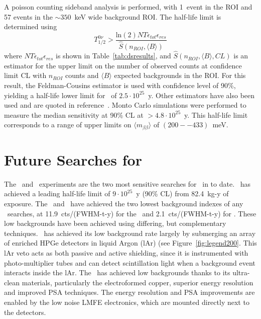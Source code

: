 \documentclass[/main.tex]{subfiles}
\begin{document}
A poisson counting sideband analysis is performed, with 1~event in the ROI and 57 events in the ${\sim}350$~keV wide background ROI.
The half-life limit is determined using
\begin{equation}
  T_{1/2}^{0\nu}>\frac{\mathrm{ln}(2)NT\epsilon_{tot}\epsilon_{res}}{\hat{S}(n_{ROI}, \langle B\rangle)}
\end{equation}
where $NT\epsilon_{tot}\epsilon_{res}$ is shown in Table~\ref{tab:dsresults}, and $\hat{S}(n_{ROI}, \langle B\rangle, CL)$ is an estimator for the upper limit on the number of observed counts at confidence limit CL with $n_{ROI}$ counts and $\langle B\rangle$ expected backgrounds in the ROI.
For this result, the Feldman-Cousins estimator\cite{feldmancousins} is used with confidence level of 90\%, yielding a half-life lower limit for  \znbb\ of $2.5\cdot10^{25}$~y.
Other estimators have also been used and are quoted in reference~\cite{mjd2019}.
Monto Carlo simulations were performed to measure the median sensitivity at 90\% CL at $>4.8\cdot10^{25}$~y.
This half-life limit corresponds to a range of upper limits on $\langle m_{\beta\beta}\rangle$ of $(200--433)$~meV.

\section{Future Searches for  \znbb} \label{sec:legend}
The \MJD\ and \Gerda\ experiments are the two most sensitive searches for \znbb\ in  to date.
\Gerda\ has achieved a leading half-life limit of $9\cdot10^{25}$~y (90\% CL) from 82.4~kg-y of exposure\cite{gerda}.
The \MJD\ and \Gerda\ have achieved the two lowest background indexes of any \znbb\ searches, at 11.9~cts/(FWHM-t-y) for the \MJD\ and 2.1~cts/(FWHM-t-y) for \Gerda.
These low backgrounds have been achieved using differing, but complementary techniques.
\Gerda\ has achieved its low background rate largely by submerging an array of enriched HPGe detectors in liquid Argon (lAr) (see Figure~\ref{fig:legend200}.
This lAr veto acts as both passive and active shielding, since it is instrumented with photo-multiplier tubes and can detect scintillation light when a background event interacts inside the lAr.
The \MJD\ has achieved low backgrounds thanks to its ultra-clean materials, particularly the electroformed copper, superior energy resolution and improved PSA techniques.
The energy resolution and PSA improvements are enabled by the low noise LMFE electronics, which are mounted directly next to the detectors.
\end{document}
